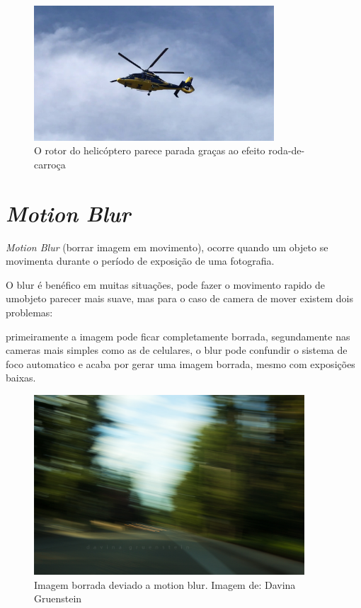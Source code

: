 \begin{figure}[H]
    \centering
    \includegraphics[width=0.8\textwidth,angle=0]{figures/helicoptero_parado.jpg}
    \caption{O rotor do helicóptero parece parada graças ao efeito roda-de-carroça }
\end{figure}
\pagebreak

\section{\textit{Motion Blur}}

\textit{Motion Blur} (borrar imagem em movimento), ocorre quando um objeto se movimenta durante o período de exposição de uma fotografia. 

O blur é benéfico em muitas situações, pode fazer o movimento rapido de umobjeto parecer mais suave, mas para o caso de camera de mover existem dois problemas: 


primeiramente a imagem pode ficar completamente borrada, segundamente nas cameras mais simples como as de celulares, o blur pode confundir o sistema de foco automatico e acaba por gerar uma imagem borrada, mesmo com exposições baixas. 

\begin{figure}[H]
    \centering
    \includegraphics[width=0.9\textwidth,angle=0]{figures/motion-blur3.jpg}
    \caption{Imagem borrada deviado a motion blur. Imagem de: Davina Gruenstein}
\end{figure}